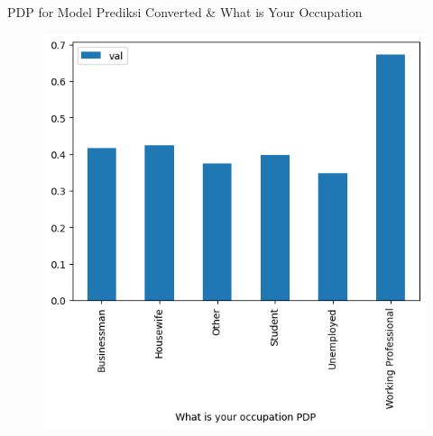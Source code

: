 \documentclass[aspectratio=169]{beamer}
\begin{document}
\begin{frame}{PDP for Model Prediksi Converted \& What is Your Occupation}
	\begin{figure}[!ht]
		\centering
		\includegraphics[scale=.5]{images/pdp-leads-2}
	\end{figure}
\end{frame}
\end{document}
